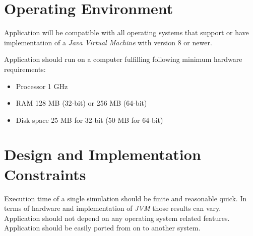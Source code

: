 \section{Operating Environment}

	{
		Application will be compatible with all operating systems that support or have implementation of a \emph{Java Virtual Machine} with version $8$ or newer.
	}\label{req:operating-enviornment:system-specification}
	{
		Application should run on a computer fulfilling following minimum hardware requirements:
		\begin{itemize}
			\item Processor 1 GHz
			\item RAM 128 MB (32-bit) or 256 MB (64-bit)
			\item Disk space 25 MB for 32-bit (50 MB for 64-bit)
		\end{itemize}
	}\label{req:operating-enviornment:hardware-specification}
\section{Design and Implementation Constraints}

	{ 
		Execution time of a single simulation should be finite and reasonable quick. In terms of hardware and implementation of \emph{JVM} those results can vary.
	}
	{ 
		Application should not depend on any operating system related features. Application should be easily ported from on to another system. 
	}
